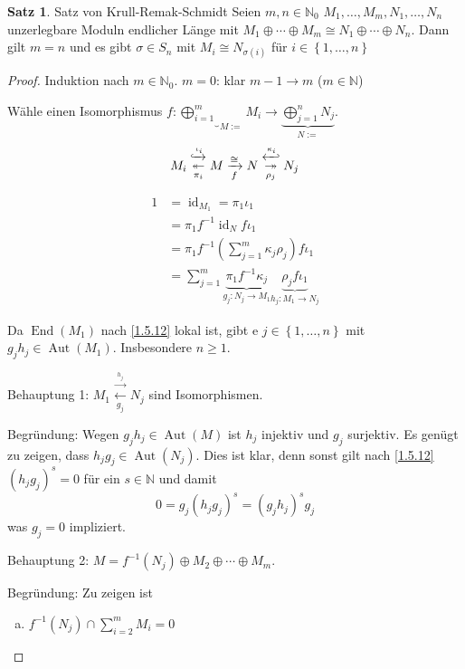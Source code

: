 \documentclass[
twoside=semi,
fontsize=12,
DIV=12, 
cleardoublepage=current,
leqno,
headings=optiontoheadandtoc, 
toc=idx
]{scrbook}
\newcommand{\N}{\mathbb{N}}
\newcommand{\brac}[1]{\left( #1 \right)}
\newcommand{\set}[1]{\left\{ #1 \right\}}
\DeclareMathOperator{\id}{id}
\DeclareMathOperator{\End}{End}
\DeclareMathOperator{\Aut}{Aut}
\theoremstyle{definition}
\newtheorem{satz}[definition]{Satz}
\begin{document}
	\begin{satz}\label{1.5.13}
		Satz von Krull-Remak-Schmidt\newline
		Seien $m, n\in \N_0$ $M_1, \dots, M_m, N_1, \dots, N_n$ unzerlegbare Moduln endlicher L\"ange mit $M_1 \oplus \cdots \oplus M_m \cong N_1 \oplus \cdots \oplus N_n$. Dann gilt $m=n$ und es gibt 
		$\sigma \in S_n$ mit $M_i \cong N_{\sigma(i)}$ f\"ur $i \in \set{1, \dots, n}$
		
		\begin{proof}
			Induktion nach $m \in \N_0$. $m = 0$: klar\newline
			$m-1 \to m$ ($m \in \N$)
			
			W\"ahle einen Isomorphismus $f: \underbrace{\bigoplus_{i=1}^m}_{M:=} M_i\to \underbrace{\bigoplus_{j=1}^n N_j}_{N:=}$.
				\[M_i \overset{\xhookrightarrow[]{\iota_i}}{\underset{\pi_i}{\twoheadleftarrow}} M \xrightarrow[f]{\cong} N \overset{\xhookleftarrow[]{\kappa_i}}{\underset{\rho_j}{\twoheadrightarrow}} N_j\]
				
			\begin{align*}
				1 &= \id_{M_1}  = \pi_1\iota_1\\
				&= \pi_1f^{-1}\id_Nf\iota_1\\
				&= \pi_1f^{-1}\brac{\sum_{j=1}^m \kappa_j\rho_j}f\iota_1\\
				&= \sum_{j=1}^m\underbrace{\pi_1f^{-1}\kappa_j}_{g_j:N_j \to M_1}\underbrace{\rho_jf\iota_1}_{h_j:M_1 \to N_j}
			\end{align*}
		
			Da $\End(M_1)$ nach \ref{1.5.12} lokal ist, gibt e $j \in \set{1, \dots, n}$ mit $g_jh_j \in \Aut(M_1)$. Insbesondere $n \geq 1$.
			
			
			\noindent Behauptung 1: $M_1 \overset{\xrightarrow{h_j}}{\xleftarrow[g_j]{}} N_j$ sind Isomorphismen.
			
			Begr\"undung: Wegen $g_jh_j \in \Aut(M)$ ist $h_j$ injektiv und $g_j$ surjektiv. Es gen\"ugt zu zeigen, dass $h_jg_j \in \Aut(N_j)$. Dies ist klar, denn sonst gilt nach \ref{1.5.12} $(h_jg_j)^s = 0$ f\"ur ein $s \in \N$ und damit 
			\[0 = g_j(h_jg_j)^s = (g_jh_j)^sg_j\]
			was $g_j = 0$ impliziert.
			
			
			\noindent Behauptung 2: $M = f^{-1}(N_j) \oplus M_2 \oplus \cdots \oplus M_m$.
			
			Begr\"undung: Zu zeigen ist 
			\begin{enumerate}[(a)]
				\item $f^{-1}(N_j) \cap \sum_{i=2}^mM_i = 0$
				

\end{enumerate}
\end{proof}
\end{satz}
\end{document}
